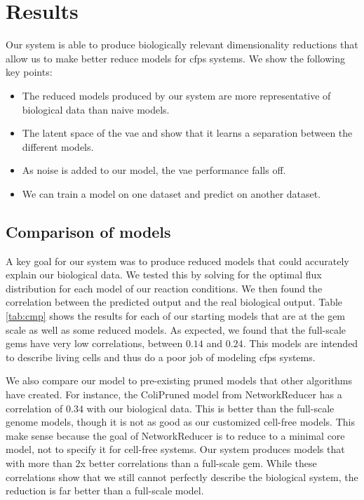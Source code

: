 \chapter{Results}\label{chap:res}
Our system is able to produce biologically relevant dimensionality reductions that allow us to make better reduce models for \gls{cfps} systems.
We show the following key points:
\begin{itemize}
\item The reduced models produced by our system are more representative of biological data than naive models.
\item The latent space of the \gls{vae} and show that it learns a separation between the different models.
\item As noise is added to our model, the \gls{vae} performance falls off.
\item We can train a model on one dataset and predict on another dataset.
\end{itemize}

\section{Comparison of models}\label{sec:cmp}
A key goal for our system was to produce reduced models that could accurately explain our biological data.
We tested this by solving for the optimal flux distribution for each model of our reaction conditions.
We then found the correlation between the predicted output and the real biological output.
Table \ref{tab:cmp} shows the results for each of our starting models that are at the \gls{gem} scale as well as some reduced models.
As expected, we found that the full-scale \glspl{gem} have very low correlations, between $0.14$ and $0.24$.
This models are intended to describe living \ecoli cells and thus do a poor job of modeling \gls{cfps} systems.

We also compare our model to pre-existing pruned models that other algorithms have created.
For instance, the ColiPruned model from NetworkReducer has a correlation of $0.34$ with our biological data.
This is better than the full-scale genome models, though it is not as good as our customized cell-free models.
This make sense because the goal of NetworkReducer is to reduce to a minimal core model, not to specify it for cell-free systems.
Our system produces models that with more than 2x better correlations than a full-scale \gls{gem}.
While these correlations show that we still cannot perfectly describe the biological system, the reduction is far better than a full-scale model.

